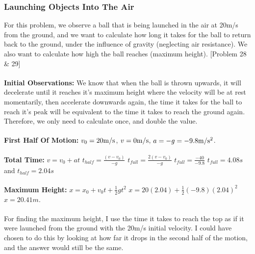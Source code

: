 \documentclass{article}
\begin{document}
\subsubsection{Launching Objects Into The Air}
For this problem, we observe a ball that is being launched in the air at 20m/s from the ground, and we want to calculate how long it takes for the ball to return back to the ground, under the influence of gravity (neglecting air resistance). We also want to calculate how high the ball reaches (maximum height). [Problem 28 \& 29] \\ \\ 
\textbf{Initial Observations:} We know that when the ball is thrown upwards, it will decelerate until it reaches it's maximum height where the velocity will be at rest momentarily, then accelerate downwards again, the time it takes for the ball to reach it's peak will be equivalent to the time it takes to reach the ground again. Therefore, we only need to calculate once, and double the value. \\ \\ 
\textbf{First Half Of Motion: } \(v_0 = 20\si[per-mode=symbol]{\meter\per\second}\), \(v = 0\si[per-mode=symbol]{\meter\per\second}\),  \(a=-g=-9.8\si[per-mode=symbol]{\meter\per\second\squared}\). \\\\
\textbf{Total Time:} \(v = v_0 + at\) \Rightarrow \(t_{half} = \frac{(v-v_0)}{-g}\) \Rightarrow \(t_{full} = \frac{2(v-v_0)}{-g}\) \Rightarrow \(t_{full} = \frac{-40}{-9.8}\) \Rightarrow \(t_{full} = 4.08s\) and \(t_{half} = 2.04s\) \\ \\ 
\textbf{Maximum Height: } \(x = x_0 + v_0t + \frac{1}{2}gt^2\) \Rightarrow \(x = 20(2.04) + \frac{1}{2}(-9.8)(2.04)^2\) \Rightarrow \(x = 20.41m\). \\ \\ 
For finding the maximum height, I use the time it takes to reach the top as if it were launched from the ground with the 20m/s initial velocity. I could have chosen to do this by looking at how far it drops in the second half of the motion, and the answer would still be the same. 
\end{document}
